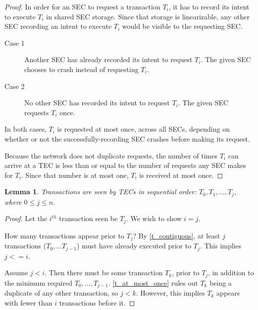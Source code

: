 \documentclass{article}
\newtheorem{lemma}[theorem]{Lemma}
\begin{document}
\begin{proof}
In order for an SEC to request a transaction $T_i$, it has to record its intent
to execute $T_i$ in shared SEC storage. Since that storage is linearizable, any
other SEC recording an intent to execute $T_i$ would be visible to the
requesting SEC.

\begin{description}
  \item[Case 1] Another SEC has already recorded its intent to request $T_i$.
The given SEC chooses to crash instead of requesting $T_i$.
  \item[Case 2] No other SEC has recorded its intent to request $T_i$. The
given SEC requests $T_i$ once.
\end{description}

In both cases, $T_i$ is requested at most once, across all SECs, depending on
whether or not the successfully-recording SEC crashes before making its
request.

Because the network does not duplicate requests, the number of times $T_i$ can
arrive at a TEC is less than or equal to the number of requests any SEC makes
for $T_i$. Since that number is at most one, $T_i$ is received at most once.
\end{proof}


\begin{lemma}
\label{t_sequential}
Transactions are seen by TECs in sequential order: $T_0, T_1, \ldots, T_j$,
where $0 \le j \le n$.
\end{lemma}

\begin{proof}

Let the $i^{th}$ transaction seen be $T_j$. We wish to show $i = j$.

How many transactions appear prior to $T_j$? By \ref{t_contiguous}, at least
$j$ transactions ($T_0, \ldots T_{j-1}$) must have already executed prior to
$T_j$. This implies $j <= i$.

Assume $j < i$. Then there must be some transaction $T_k$, prior to $T_j$, in
addition to the minimum required $T_0, \ldots, T_{j-1}$. \ref{t_at_most_once}
rules out $T_k$ being a duplicate of any other transaction, so $j < k$.
However, this implies $T_k$ appears with fewer than $i$ transactions before it.


\end{proof}
\end{document}
